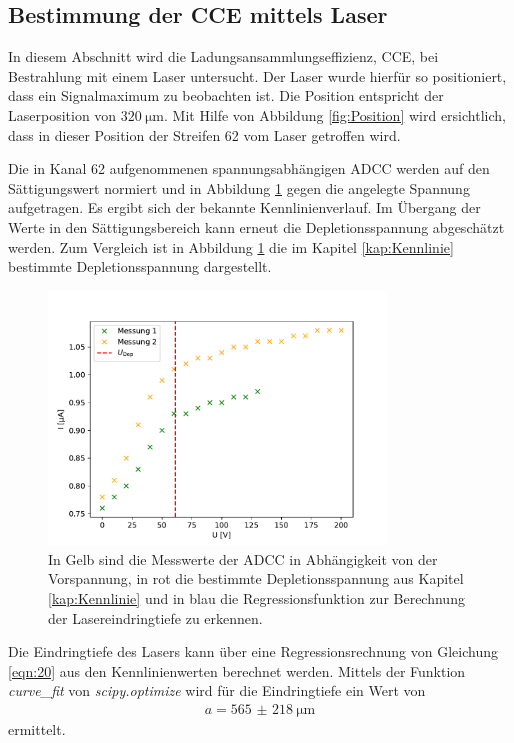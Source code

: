 \subsection{Bestimmung der CCE mittels Laser}
\label{kap:CCEL}
In diesem Abschnitt wird die Ladungsansammlungseffizienz, CCE, bei Bestrahlung mit einem Laser untersucht. Der Laser wurde hierfür so positioniert, dass ein Signalmaximum zu beobachten ist. Die Position entspricht der Laserposition von $\SI{320}{\micro\metre}$. Mit Hilfe von Abbildung \ref{fig:Position} wird ersichtlich, dass in dieser Position der Streifen 62 vom Laser getroffen wird.

Die in Kanal 62 aufgenommenen spannungsabhängigen ADCC werden auf den Sättigungswert normiert und in Abbildung \ref{fig:KennlinieLaser} gegen die angelegte Spannung aufgetragen. Es ergibt sich der bekannte Kennlinienverlauf. Im Übergang der Werte in den Sättigungsbereich kann erneut die Depletionsspannung abgeschätzt werden. Zum Vergleich ist in Abbildung \ref{fig:KennlinieLaser} die im Kapitel \ref{kap:Kennlinie} bestimmte Depletionsspannung dargestellt.
\begin{figure}
  \centering
  \includegraphics[width=0.8\textwidth]{plots/Kennlinie.pdf}
  \caption{In Gelb sind die Messwerte der ADCC in Abhängigkeit von der Vorspannung, in rot die bestimmte Depletionsspannung aus Kapitel \ref{kap:Kennlinie} und in blau die Regressionsfunktion zur Berechnung der Lasereindringtiefe zu erkennen.}
  \label{fig:KennlinieLaser}
\end{figure}
\FloatBarrier
Die Eindringtiefe des Lasers kann über eine Regressionsrechnung von Gleichung \eqref{eqn:20} aus den Kennlinienwerten berechnet werden. Mittels der Funktion \textit{curve\_fit} von \textit{scipy.optimize} \cite{scipy} wird für die Eindringtiefe ein Wert von
\begin{align*}
   a= \SI{565(218)}{\micro\metre}
\end{align*}
ermittelt.

